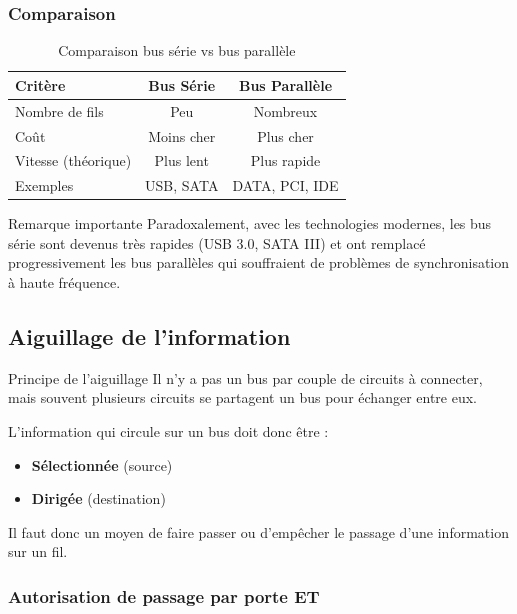 \documentclass[a4paper,12pt]{article}
\begin{document}
\subsubsection{Comparaison}

\begin{table}[h]
\centering
\begin{tabular}{|l|c|c|}
\hline
\textbf{Critère} & \textbf{Bus Série} & \textbf{Bus Parallèle} \\
\hline
Nombre de fils & Peu & Nombreux \\
\hline
Coût & Moins cher & Plus cher \\
\hline
Vitesse (théorique) & Plus lent & Plus rapide \\
\hline
Exemples & USB, SATA & DATA, PCI, IDE \\
\hline
\end{tabular}
\caption{Comparaison bus série vs bus parallèle}
\end{table}

\begin{remarkbox}{Remarque importante}
Paradoxalement, avec les technologies modernes, les bus série sont devenus très rapides (USB 3.0, SATA III) et ont remplacé progressivement les bus parallèles qui souffraient de problèmes de synchronisation à haute fréquence.
\end{remarkbox}

\subsection{Aiguillage de l'information}

\begin{defbox}{Principe de l'aiguillage}
Il n'y a pas un bus par couple de circuits à connecter, mais souvent plusieurs circuits se partagent un bus pour échanger entre eux. 

L'information qui circule sur un bus doit donc être :
\begin{itemize}
    \item \textbf{Sélectionnée} (source)
    \item \textbf{Dirigée} (destination)
\end{itemize}

Il faut donc un moyen de faire passer ou d'empêcher le passage d'une information sur un fil.
\end{defbox}

\subsubsection{Autorisation de passage par porte ET}
\end{document}
